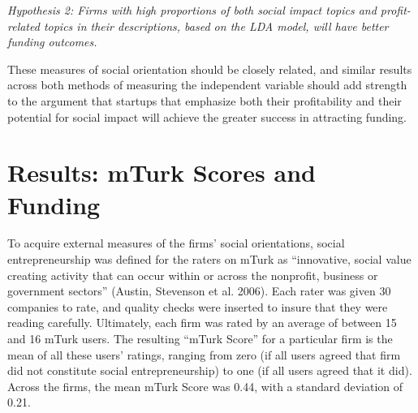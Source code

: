 \documentclass[12pt]{article}
\begin{document}
\textit{Hypothesis 2: Firms with high proportions of both social impact topics and profit-related topics in their descriptions, based on the LDA model, will have better funding outcomes.}

These measures of social orientation should be closely related, and similar results across both methods of measuring the independent variable should add strength to the argument that startups that emphasize both their profitability and their potential for social impact will achieve the greater success in attracting funding.


\section{Results: mTurk Scores and Funding}

To acquire external measures of the firms’ social orientations, social entrepreneurship was defined for the raters on mTurk as ``innovative, social value creating activity that can occur within or across the nonprofit, business or government sectors'' (Austin, Stevenson et al. 2006). Each rater was given 30 companies to rate, and quality checks were inserted to insure that they were reading carefully. Ultimately, each firm was rated by an average of between 15 and 16 mTurk users. The resulting ``mTurk Score'' for a particular firm is the mean of all these users’ ratings, ranging from zero (if all users agreed that firm did not constitute social entrepreneurship) to one (if all users agreed that it did). Across the firms, the mean mTurk Score was 0.44, with a standard deviation of 0.21. 
\end{document}
